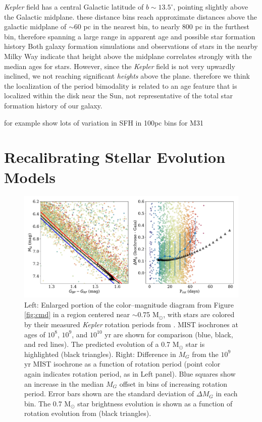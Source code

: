 \documentclass[preprint2]{aastex62}
\newcommand{\Kepler}{\textsl{Kepler}\xspace}
\begin{document}
\Kepler field has a central Galactic latitude of $b\sim13.5^\circ$, pointing slightly above the Galactic midplane. 
these distance bins reach approximate distances above the galactic midplane of $\sim$60 pc in the nearest bin, to nearly 800 pc in the furthest bin, therefore spanning a large range in apparent age and possible star formation history
Both galaxy formation simulations \citep{ma2017} and observations of stars in the nearby Milky Way \citep{xiang2017} indicate that height above the midplane correlates strongly with the median ages for stars. However, since the \Kepler field is not very upwardly inclined, we not reaching significant {\it heights} above the plane. therefore we think the localization of the period bimodality is related to an age feature that is localized within the disk near the Sun, not representative of the total star formation history of our galaxy.

\citet{lewis2015} for example show lots of variation in SFH in 100pc bins for M31




\section{Recalibrating Stellar Evolution Models}

\begin{figure}
\centering
\includegraphics[width=6in]{../figures/cmd_zoom}
\caption{
Left: Enlarged portion of the color--magnitude diagram from Figure \ref{fig:cmd} in a region centered near $\sim$0.75 M$_\odot$, with stars are colored by their measured \Kepler rotation periods from \citet{mcquillan2014}.
MIST isochrones at ages of $10^8$, $10^9$, and $10^10$ yr are shown for comparison (blue, black, and red lines). The predicted evolution of a 0.7 M$_\odot$ star is highlighted (black triangles). %
Right: Difference in $M_G$ from the $10^9$ yr MIST isochrone as a function of rotation period (point color again indicates rotation period, as in Left panel). Blue squares show an increase in the median $M_G$ offset in bins of increasing rotation period. Error bars shown are the standard deviation of $\Delta M_G$ in each bin. The 0.7 M$_\odot$ star brightness evolution is shown as a function of rotation evolution from \citet{meibom2009} (black triangles).
}
\label{fig:cmd_zoom}
\end{figure}
\end{document}
